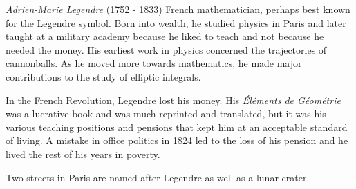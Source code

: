 \documentclass[12pt]{article}
\begin{document}
\emph{Adrien-Marie Legendre} (1752 - 1833) French mathematician, perhaps best known for the Legendre symbol. Born into wealth, he studied physics in Paris and later taught at a military academy because he liked to teach and not because he needed the money. His earliest work in physics concerned the trajectories of cannonballs. As he moved more towards mathematics, he made major contributions to the study of elliptic integrals.

In the French Revolution, Legendre lost his money. His {\it \'El\'ements de G\'eom\'etrie} was a lucrative book and was much reprinted and translated, but it was his various teaching positions and pensions that kept him at an acceptable standard of living. A mistake in office politics in 1824 led to the loss of his pension and he lived the rest of his years in poverty.

Two streets in Paris are named after Legendre as well as a lunar crater.
\end{document}
